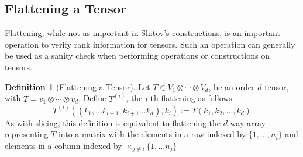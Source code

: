 \documentclass[12pt,a4paper,oneside]{book}
\theoremstyle{definition}
\newtheorem{definition}{Definition}[section]
\begin{document}
\subsection{Flattening a Tensor}\label{subsection:tensorflattening}
Flattening, while not as important in Shitov's constructions, is an important operation to verify rank information for tensors. Such an operation can generally be used as a sanity check when performing operations or constructions on tensors.
\begin{definition}[Flattening a Tensor]\label{defn:tensorflattening}
    Let $T \in V_1 \otimes \cdots \otimes V_d$,  be an order $d$ tensor, with $T = v_1 \otimes \cdots \otimes v_d$. Define $T^{(i)}$, the $i$-th flattening as follows $$T^{(i)}((k_1, \ldots k_{i-1},k_{i+1} \ldots k_d),k_i) := T(k_1, k_2 , \ldots , k_d)$$
    As with slicing, this definition is equivalent to flattening the $d$-way array representing $T$ into a matrix with the elements in a row indexed by $\{1, \ldots, n_i\}$ and elements in a column indexed by $\times_{j \neq i} \{1, \ldots n_j\}$
\end{definition}
\end{document}
